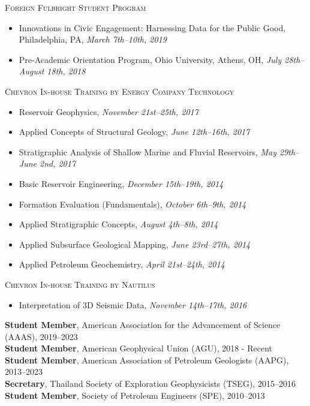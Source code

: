 \documentclass[10pt, letter]{article}
\newcommand{\margintext}[1]{\marginnote{\normalsize\textbf #1 |}}
\begin{document}
\bigskip
\textsc{Foreign Fulbright Student Program}
\begin{itemize}[leftmargin=*]
    \item[] Innovations in Civic Engagement: Harnessing Data for the Public Good, Philadelphia, PA, \textit{March 7th–10th, 2019}
    \item[] Pre-Academic Orientation Program, Ohio University, Athens, OH, \textit{July 28th–August 18th, 2018}
\end{itemize} 

\bigskip
\textsc{Chevron In-house Training by Energy Company Technology}
\begin{itemize}[leftmargin=*]
    \item[] Reservoir Geophysics, \textit{November 21st–25th, 2017}
    \item[] Applied Concepts of Structural Geology, \textit{June 12th–16th, 2017}
    \item[] Stratigraphic Analysis of Shallow Marine and Fluvial Reservoirs, \textit{May 29th–June 2nd, 2017} 
    \item[] Basic Reservoir Engineering, \textit{December 15th–19th, 2014}
    \item[] Formation Evaluation (Fundamentals), \textit{October 6th–9th, 2014}
    \item[] Applied Stratigraphic Concepts, \textit{August 4th–8th, 2014}
    \item[] Applied Subsurface Geological Mapping, \textit{June 23rd–27th, 2014}
    \item[] Applied Petroleum Geochemistry, \textit{April 21st–24th, 2014}
\end{itemize} 

\bigskip
\textsc{Chevron In-house Training by Nautilus}
\begin{itemize}[leftmargin=*]
    \item[] Interpretation of 3D Seismic Data, \textit{November 14th–17th, 2016}
\end{itemize} 

\bigskip
\margintext{Professional Societies}
\textbf{Student Member}, American Association for the Advancement of Science (AAAS), 2019–2023 \\
\textbf{Student Member}, American Geophysical Union (AGU), 2018 - Recent \\
\textbf{Student Member}, American Association of Petroleum Geologists (AAPG), 2013–2023 \\
\textbf{Secretary}, Thailand Society of Exploration Geophysicists (TSEG), 2015–2016 \\
\textbf{Student Member}, Society of Petroleum Engineers (SPE), 2010–2013
\end{document}
